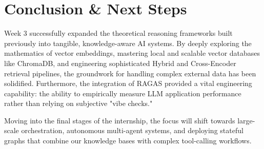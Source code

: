 \documentclass[12pt, a4paper]{article}
\begin{document}
\vspace{0.5cm}

\section{Conclusion \& Next Steps}
Week 3 successfully expanded the theoretical reasoning frameworks built previously into tangible, knowledge-aware AI systems. By deeply exploring the mathematics of vector embeddings, mastering local and scalable vector databases like ChromaDB, and engineering sophisticated Hybrid and Cross-Encoder retrieval pipelines, the groundwork for handling complex external data has been solidified. Furthermore, the integration of RAGAS provided a vital engineering capability: the ability to empirically measure LLM application performance rather than relying on subjective "vibe checks."

Moving into the final stages of the internship, the focus will shift towards large-scale orchestration, autonomous multi-agent systems, and deploying stateful graphs that combine our knowledge bases with complex tool-calling workflows.
\end{document}
